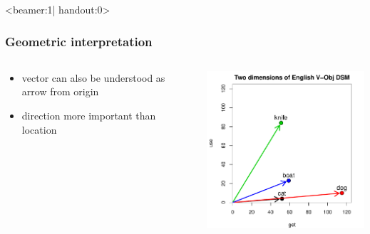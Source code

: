 \documentclass[t]{beamer} %
\begin{document}
\begin{frame}<beamer:1| handout:0>
  \frametitle{Geometric interpretation}

  \begin{columns}[T]
    \begin{column}{40mm}
      \begin{itemize}
      \item vector can also be understood as arrow from origin
      \item direction more important than location
      \end{itemize}
    \end{column}
    \begin{column}{75mm}      
      \ungap[1]
      \includegraphics[width=75mm]{img/hieroglyph_2d_3}
    \end{column}
  \end{columns}
\end{frame}
\end{document}
